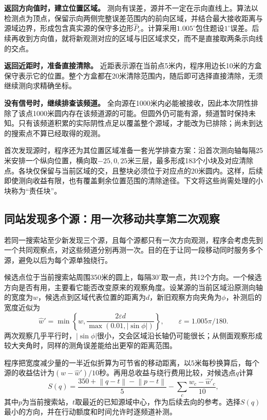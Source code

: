 \documentclass[UTF8,a4paper,12pt,fontset=fandol]{ctexart}
\newcommand{\norm}[1]{\left\lVert#1\right\rVert}
\begin{document}
\textbf{返回方向值时，建立位置区域。} 测向有误差，源并不一定在示向直线上。算法以检测点为顶点，保留示向两侧完整误差范围内的前向区域，并结合最大接收距离与源域边界，形成包含真实源的保守多边形$\widehat P_c$。计算采用$1.005^\circ$包住题设$1^\circ$误差。后续再收到方向值，就将新观测对应的区域与旧区域求交，而不是直接取两条示向线的交点。

\textbf{返回近距时，准备直接清除。} 近距表示源在当前点5米内，程序用边长10米的方盒保守表示它的位置。整个方盒都在20米清除范围内，随后即可选择直接清除，无须继续测向求精确坐标。

\textbf{没有信号时，继续排查该频道。} 全向源在1000米内必能被接收，因此本次阴性排除了该点1000米圆内存在该频道源的可能。但圆外仍可能有源，频道暂时保持未知。只有该频道积累的实际阴性点足以覆盖整个源域，才能改为已排除；尚未到达的搜索点不算已经取得的观测。

首次发现源时，程序还为其位置区域准备一套光学排查方案：沿首次测向轴每隔25米安排一个纵向位置，横向取$-25,0,25$米三层，最多形成183个小块及对应清除点。各块仅保留与当前区域的交，且整块必须位于对应点的20米圆内。这样，后续即使测向收益有限，也有覆盖剩余位置范围的清除途径。下文将这些尚需处理的小块称为“责任块”。

\subsection{同站发现多个源：用一次移动共享第二次观察}
若同一搜索站至少新发现三个源，且每个源都只有一次方向观测，程序会考虑先到一个共同观察点，对这些频道分别再测一次。目的在于让同一段移动同时服务多个源，避免以后为每个源单独绕行。

候选点位于当前搜索站周围350米的圆上，每隔$30^\circ$取一点，共12个方向。一个候选方向是否有用，主要看它能否改变原来的观察角度。设某源的当前区域沿原测向轴的宽度为$w$，候选点到区域代表位置的距离为$d$，新旧观察方向夹角为$\phi$，补测后的宽度近似为
\begin{equation}\label{eq:q3width}
\widehat w'=\min\left\{w,\frac{2\varepsilon d}{\max(0.01,|\sin\phi|)}\right\},
\qquad \varepsilon=1.005\pi/180.
\end{equation}
两次观察几乎平行时，$|\sin\phi|$很小，交会区域沿长轴仍可能很长；从侧面观察形成较大夹角时，同样的测角误差能给出更窄的距离范围。

程序把宽度减少量的一半近似折算为可节省的移动距离，以5米每秒换算后，每个源的收益估计为$(w-\widehat w')/10$秒。再用总收益与绕行费用比较，对候选点$q$计算
\begin{equation}
S(q)=\frac{350+\norm{q-t}-\norm{p-t}}5
-\sum_c\frac{w_c-\widehat w'_c}{10},
\end{equation}
其中$p$为当前搜索站，$t$取最近的已知源域中心，作为后续去向的参考。选择$S(q)$最小的方向，并在行动额度和时间允许时逐频道补测。
\end{document}
